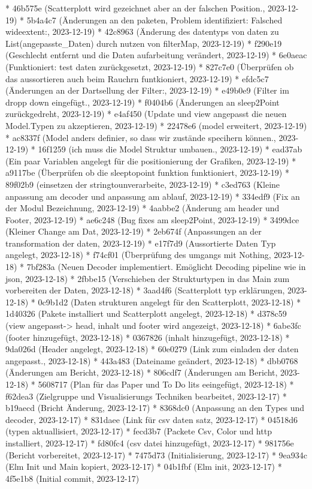 \documentclass[usegeometry=true]{scrartcl}
\begin{document}
* 46b575e (Scatterplott wird gezeichnet aber an der falschen Position., 2023-12-19)
* 5b4a4c7 (Änderungen an den paketen, Problem identifiziert: Falsched wideextent:, 2023-12-19)
* 42c8963 (Änderung des datentyps von daten zu List(angepasste_Daten) durch nutzen von filterMap, 2023-12-19)
* f290e19 (Geschlecht entfernt und die Daten aufarbeitung verändert, 2023-12-19)
* 6e0aeac (Funktioniert: test daten zurückgesetzt, 2023-12-19)
* 827c7e0 (Überprüfen ob das aussortieren auch beim Rauchrn funtkioniert, 2023-12-19)
* efdc5c7 (Änderungen an der Dartsellung der Filter:, 2023-12-19)
* e49b0e9 (Filter im dropp down eingefügt., 2023-12-19)
* f0404b6 (Änderungen an sleep2Point zurückgedreht, 2023-12-19)
* e4af450 (Update und view angepasst die neuen Model.Typen zu akzeptieren, 2023-12-19)
* 22478e6 (model erweitert, 2023-12-19)
* ac8337f (Model anders definier, so dass wir zustände specihern können., 2023-12-19)
* 16f1259 (ich muss die Model Struktur umbauen., 2023-12-19)
* ead37ab (Ein paar Variablen angelegt für die positionierung der Grafiken, 2023-12-19)
* a9117be (Überprüfen ob die sleeptopoint funktion funktioniert, 2023-12-19)
* 89f02b9 (einsetzen der stringtounverarbeite, 2023-12-19)
* c3ed763 (Kleine anpassung am decoder und anpassung am ablauf, 2023-12-19)
* 334edf9 (Fix an der Modul Bezeichnung, 2023-12-19)
* 4aabbe2 (Änderung am header und Footer, 2023-12-19)
* ae6c248 (Bug fixes am sleep2Point, 2023-12-19)
* 3499dce (Kleiner Change am Dat, 2023-12-19)
* 2eb674f (Anpassungen an der transformation der daten, 2023-12-19)
* e17f7d9 (Aussortierte Daten Typ angelegt, 2023-12-18)
* f74cf01 (Überprüfung des umgangs mit Nothing, 2023-12-18)
* 7bf283a (Neuen Decoder implementiert. Emöglicht Decoding pipeline wie in json, 2023-12-18)
* 2fbbe15 (Verschieben der Strukturtypen in das Main zum vorbereiten der Daten, 2023-12-18)
* 3aad4f6 (Scatterplott typ erklärungen, 2023-12-18)
* 0c9b1d2 (Daten strukturen angelegt für den Scatterplott, 2023-12-18)
* 1d40326 (Pakete installiert und Scatterplott angelegt, 2023-12-18)
* d378c59 (view angepasst-> head, inhalt und footer wird angezeigt, 2023-12-18)
* 6abe3fc (footer hinzugefügt, 2023-12-18)
* 0367826 (inhalt hinzugefügt, 2023-12-18)
* 9da026d (Header angelegt, 2023-12-18)
* 60e0279 (Link zum einladen der daten angepasst., 2023-12-18)
* 443a483 (Dateiname geändert, 2023-12-18)
* dbb0768 (Änderungen am Bericht, 2023-12-18)
* 806cdf7 (Änderungen am Bericht, 2023-12-18)
* 5608717 (Plan für das Paper und To Do lits eeingefügt, 2023-12-18)
* f62dea3 (Zielgruppe und Visualisierungs Techniken bearbeitet, 2023-12-17)
* b19aecd (Bricht Änderung, 2023-12-17)
* 8368dc0 (Anpassung an den Types und decoder, 2023-12-17)
* 831daee (Link für csv daten satz, 2023-12-17)
* 04518d6 (typen aktuallisiert, 2023-12-17)
* fecd3b7 (Packete Csv, Color und http installiert, 2023-12-17)
* fd80fc4 (csv datei hinzugefügt, 2023-12-17)
* 981756e (Bericht vorbereitet, 2023-12-17)
* 7475d73 (Initialisierung, 2023-12-17)
* 9ea934c (Elm Init und Main kopiert, 2023-12-17)
* 04b1fbf (Elm init, 2023-12-17)
* 4f5e1b8 (Initial commit, 2023-12-17)
\printbibliography
\end{document}
